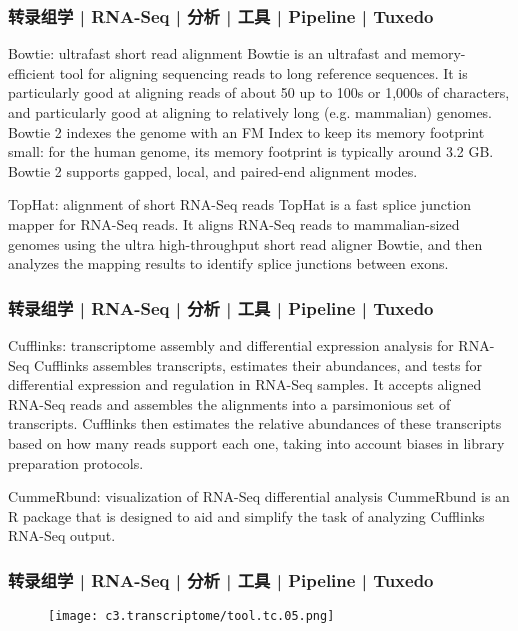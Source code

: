 \begin{frame}
  \frametitle{转录组学 | RNA-Seq | 分析 | 工具 | Pipeline | Tuxedo}
  \begin{block}{Bowtie: ultrafast short read alignment}
    Bowtie is an ultrafast and memory-efficient tool for aligning sequencing reads to long reference sequences. It is particularly good at aligning reads of about 50 up to 100s or 1,000s of characters, and particularly good at aligning to relatively long (e.g. mammalian) genomes. Bowtie 2 indexes the genome with an FM Index to keep its memory footprint small: for the human genome, its memory footprint is typically around 3.2 GB. Bowtie 2 supports gapped, local, and paired-end alignment modes.
  \end{block}
  \pause
  \begin{block}{TopHat: alignment of short RNA-Seq reads}
    TopHat is a fast splice junction mapper for RNA-Seq reads. It aligns RNA-Seq reads to mammalian-sized genomes using the ultra high-throughput short read aligner Bowtie, and then analyzes the mapping results to identify splice junctions between exons.
  \end{block}
\end{frame}

\begin{frame}
  \frametitle{转录组学 | RNA-Seq | 分析 | 工具 | Pipeline | Tuxedo}
  \begin{block}{Cufflinks: transcriptome assembly and differential expression analysis for RNA-Seq}
    Cufflinks assembles transcripts, estimates their abundances, and tests for differential expression and regulation in RNA-Seq samples. It accepts aligned RNA-Seq reads and assembles the alignments into a parsimonious set of transcripts. Cufflinks then estimates the relative abundances of these transcripts based on how many reads support each one, taking into account biases in library preparation protocols.
  \end{block}
  \pause
  \begin{block}{CummeRbund: visualization of RNA-Seq differential analysis}
    CummeRbund is an R package that is designed to aid and simplify the task of analyzing Cufflinks RNA-Seq output.
  \end{block}
\end{frame}

\begin{frame}
  \frametitle{转录组学 | RNA-Seq | 分析 | 工具 | Pipeline | Tuxedo}
  \begin{figure}
    \centering
    \texttt{[image: c3.transcriptome/tool.tc.05.png]}
  \end{figure}
\end{frame}

